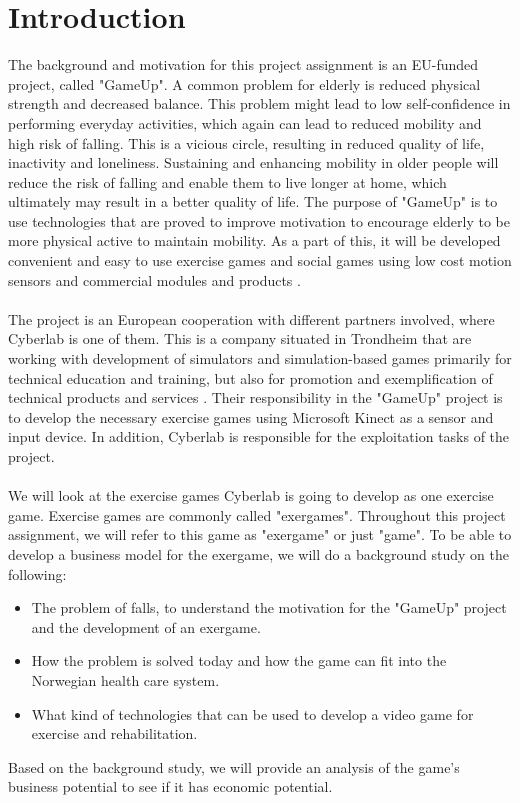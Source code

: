 \chapter{Introduction}
The background and motivation for this project assignment is an EU-funded project, called "GameUp". A common problem for elderly is reduced physical strength and decreased balance. This problem might lead to low self-confidence in performing everyday activities, which again can lead to reduced mobility and high risk of falling. This is a vicious circle, resulting in reduced quality of life, inactivity and loneliness. Sustaining and enhancing mobility in older people will reduce the risk of falling and enable them to live longer at home, which ultimately may result in a better quality of life. The purpose of "GameUp" is to use technologies that are proved to improve motivation to encourage elderly to be more physical active to maintain mobility.  As a part of this, it will be developed convenient and easy to use exercise games and social games using low cost motion sensors and commercial modules and products \cite{gameup}.\\ \\ The project is an European cooperation with different partners involved, where Cyberlab is one of them. This is a company situated in Trondheim that are working with development of simulators and simulation-based games primarily for technical education and training, but also for promotion and exemplification of technical products and services \cite{cyberlab}. Their responsibility in the "GameUp" project is to develop the necessary exercise games using Microsoft Kinect as a sensor and input device. In addition, Cyberlab is responsible for the exploitation tasks of the project.  \\ \\
We will look at the exercise games Cyberlab is going to develop as one exercise game.  Exercise games are commonly called "exergames". Throughout this project assignment, we will refer to this game as "exergame" or just "game".  To be able to develop a business model for the exergame, we will do a background study on the following:
\begin{itemize}
\renewcommand{\labelitemi}{$\bullet$}
\item The problem of falls, to understand the motivation for the "GameUp" project and the development of an exergame. 
\item How the problem is solved today and how the game can fit into the Norwegian health care system.
\item What kind of technologies that can be used to develop a video game for exercise and rehabilitation.
\end{itemize}
Based on the background study, we will provide an analysis of the game’s business potential to see if it has economic potential. 

